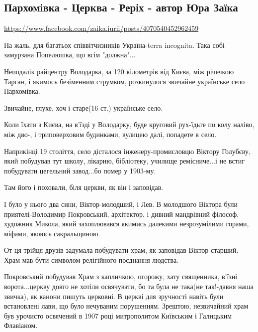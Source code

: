  


\subsection{Пархомівка - Церква - Реріх - автор Юра Заїка}
\label{sec:16_10_2020.fb.yura_zaika.1.ukraine_rerih_parhomivka}

\url{https://www.facebook.com/zaika.iurii/posts/4070540452962459}

На жаль, для багатьох співвітчизників Україна-terra incognita.  Така собі
замурзана Попелюшка, що всім "должна"...

Неподалік райцентру Володарка, за 120 кілометрів від  Києва, між річечкою
Тарган, і якимось безіменним струмком, розкинулося звичайне українське село
Пархомівка. 

Звичайне, глухе, хоч і старе(16 ст.) українське село.

Коли їхати з Києва, на в'їзді у Володарку, буде круговий рух-їдьте по колу
наліво, між дво-, і триповерховим будинками, вулицею далі, попадете в село.

Наприкінці 19 століття, село дісталося інженеру-промисловцю Віктору Голубєву,
який побудував тут школу, лікарню, бібліотеку, училище ремісниче...і не встиг
побудувати цегельний завод...бо помер у 1903-му.

Там його і поховали, біля церкви, як він і заповідав.

І було у нього два сини, Віктор-молодший, і Лев. В молодшого Віктора були
приятелі-Володимир Покровський, архітектор, і дивний мандрівний філософ,
художник Микола, який захоплювався якимись далекими незрозумілими горами,
міфами, якоюсь сакральщиною. 

От ця трійця друзів задумала побудувати храм, як заповідав Віктор-старший. Храм
мав бути символом релігійного поєднання людства.

Покровський побудував Храм з капличкою, огорожу, хату священника, в'їзні
ворота...церкву довго не хотіли освячувати, бо та була не така(не так!-давня
наша звичка), як канони пишуть церковні. В церкві для зручності навіть були
встановлені лави, що було нечуваним порушенням. Зрештою, незвичайний храм був
урочисто освячений в 1907 році митрополитом Київським і Галицьким Флавіаном.

